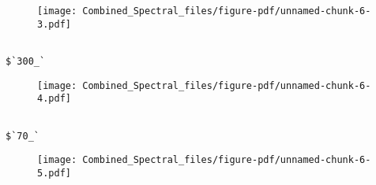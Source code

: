 \documentclass[
  letterpaper,
  DIV=11,
  numbers=noendperiod]{scrartcl}
\begin{document}
\begin{figure}[H]

{\centering \texttt{[image: Combined\_Spectral\_files/figure-pdf/unnamed-chunk-6-3.pdf]}

}

\end{figure}

\begin{verbatim}

$`300_`
\end{verbatim}

\begin{figure}[H]

{\centering \texttt{[image: Combined\_Spectral\_files/figure-pdf/unnamed-chunk-6-4.pdf]}

}

\end{figure}

\begin{verbatim}

$`70_`
\end{verbatim}

\begin{figure}[H]

{\centering \texttt{[image: Combined\_Spectral\_files/figure-pdf/unnamed-chunk-6-5.pdf]}

}

\end{figure}
\end{document}

